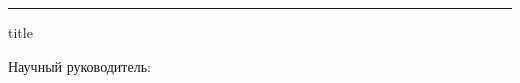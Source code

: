 
{
	\centering
	\insertinstitute\par
	\rule{\linewidth}{0.5pt}
	\centering
	\vfill
	\insertauthor\par
	\vfill
	\begin{beamercolorbox}[sep=8pt, center]{title}
		\inserttitle\par%
    \end{beamercolorbox}%
	\vfill
	\insertsubtitle\par
	\vfill
	\begin{flushright}
		Научный руководитель: \\
		\supervisorRegalia \\
		\supervisorFio
	\end{flushright}
    \vfill
    \insertdate\par
    {\inserttitlegraphic\par}
}

\institute{\thesisFirstOrganization\newline\thesisSecondOrganization}
\author{\thesisAuthor}
\title{\thesisTitle}
\subtitle{Специальность \thesisSpecialtyNumber~---~\thesisSpecialtyTitle}
\date{\thesisCity, \thesisYear}